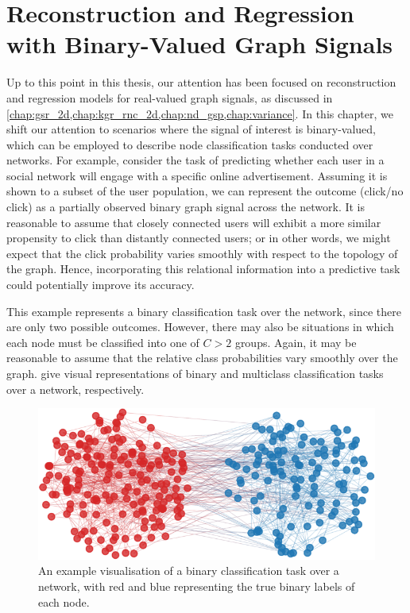 \chapter{Reconstruction and Regression with Binary-Valued Graph Signals} %

\label{chap:binary} 


Up to this point in this thesis, our attention has been focused on reconstruction and regression models for real-valued graph signals, as discussed in \cref{chap:gsr_2d,chap:kgr_rnc_2d,chap:nd_gsp,chap:variance}. In this chapter, we shift our attention to scenarios where the signal of interest is binary-valued, which can be employed to describe node classification tasks conducted over networks. For example, consider the task of predicting whether each user in a social network will engage with a specific online advertisement. Assuming it is shown to a subset of the user population, we can represent the outcome (click/no click) as a partially observed binary graph signal across the network. It is reasonable to assume that closely connected users will exhibit a more similar propensity to click than distantly connected users; or in other words, we might expect that the click probability varies smoothly with respect to the topology of the graph. Hence, incorporating this relational information into a predictive task could potentially improve its accuracy.

This example represents a binary classification task over the network, since there are only two possible outcomes. However, there may also be situations in which each node must be classified into one of $C > 2$ groups. Again, it may be reasonable to assume that the relative class probabilities vary smoothly over the graph.  give visual representations of binary and multiclass classification tasks over a network, respectively.


\begin{figure}[t] 
    \begin{center}
        \includegraphics[width=0.7\linewidth]{Figures/2class_graph.pdf}
    \end{center}
   \caption[Visualisation of a binary classification task over a network]{An example visualisation of a binary classification task over a network, with red and blue representing the true binary labels of each node.} 
    \label{fig:binary_class_graph}
\end{figure} 

